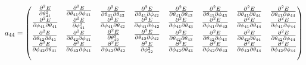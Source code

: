 \documentclass[9pt]{article}
\begin{document}
\begin{equation*}
	a_{44} = 
	\begin{pmatrix}
		\begin{matrix} 
			\pdv[2]{E}{\theta_{41}} & \pdv{E}{\theta_{41}}{\phi_{41}} \\
			\pdv{E}{\phi_{41}}{\theta_{41}} & \pdv[2]{E}{\phi_{41}}
		\end{matrix}& 	
		\begin{matrix} 
			\pdv{E}{\theta_{41}}{\theta_{42}} & \pdv{E}{\theta_{41}}{\phi_{42}} \\
			\pdv{E}{\phi_{41}}{\theta_{42}} & \pdv{E}{\phi_{41}}{\phi_{42}} 
		\end{matrix}& 
		\begin{matrix} 
			\pdv{E}{\theta_{41}}{\theta_{43}} & \pdv{E}{\theta_{41}}{\phi_{43}} \\
			\pdv{E}{\phi_{41}}{\theta_{43}} & \pdv{E}{\phi_{41}}{\phi_{43}} 
		\end{matrix}&
		\begin{matrix} 
			\pdv{E}{\theta_{41}}{\theta_{44}} & \pdv{E}{\theta_{41}}{\phi_{44}} \\
			\pdv{E}{\phi_{41}}{\theta_{44}} & \pdv{E}{\phi_{41}}{\phi_{44}} 
		\end{matrix}\\
		\begin{matrix} 
			\pdv{E}{\theta_{42}}{\theta_{41}} & \pdv{E}{\theta_{42}}{\phi_{41}} \\
			\pdv{E}{\phi_{42}}{\theta_{41}} & \pdv{E}{\phi_{42}}{\phi_{41}} 
		\end{matrix} & 
		\begin{matrix} 
			\pdv[2]{E}{\theta_{42}} & \pdv{E}{\theta_{42}}{\phi_{42}} \\
			\pdv{E}{\phi_{42}}{\theta_{42}} & \pdv[2]{E}{\phi_{42}} 
		\end{matrix}&
		\begin{matrix} 
			\pdv{E}{\theta_{42}}{\theta_{43}} & \pdv{E}{\theta_{42}}{\phi_{43}} \\
			\pdv{E}{\phi_{42}}{\theta_{43}} & \pdv{E}{\phi_{42}}{\phi_{43}} 
		\end{matrix}&
		\begin{matrix} 
			\pdv{E}{\theta_{42}}{\theta_{44}} & \pdv{E}{\theta_{42}}{\phi_{44}} \\
			\pdv{E}{\phi_{42}}{\theta_{44}} & \pdv{E}{\phi_{42}}{\phi_{44}} 
		\end{matrix}\\
		\begin{matrix} 

\end{matrix}
\end{pmatrix}
\end{equation*}
\end{document}
